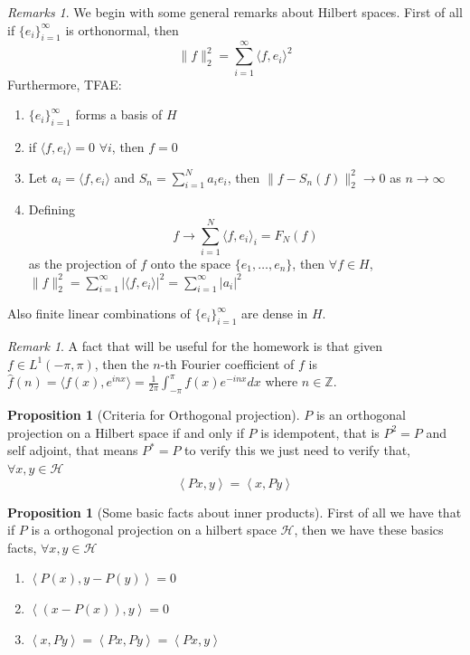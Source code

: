 \documentclass[13pt]{article}
\newcommand{\inprod}[1]{\left\langle #1 \right\rangle}
\theoremstyle{definition} --- default
\newtheorem{proposition}[theorem]{Proposition}
\theoremstyle{definition}
\theoremstyle{remark}
\newtheorem{remark}[theorem]{Remark}
\newtheorem{remarks}[theorem]{Remarks}
\begin{document}
\begin{remarks}
    We begin with some general remarks about Hilbert spaces. First of all if $\{e_i\}_{i=1}^\infty$ is orthonormal, then 
    $$\|f\|_2^2 = \sum_{i=1}^\infty \langle f, e_i \rangle^2$$
    Furthermore, TFAE: 
    \begin{enumerate}
        \item $\{e_i\}_{i=1}^\infty$ forms a basis of $H$
        \item if $\langle f,e_i \rangle = 0$ $\forall i$, then $f = 0$
        \item Let $a_i = \langle f, e_i \rangle$ and $S_n = \sum_{i=1}^N a_i e_i$, then $\|f - S_n(f)\|_2^2 \to 0$ as $n \to \infty$
        \item Defining
        $$ f \to \sum_{i=1}^N \langle f, e_i \rangle_i = F_N(f)$$ as the projection of $f$ onto the space $\{e_1,\ldots,e_n\}$, then $\forall f \in H$, $\|f\|_2^2 = \sum_{i=1}^\infty |\langle f, e_i \rangle|^2 = \sum_{i=1}^\infty |a_i|^2$
    \end{enumerate}
    Also finite linear combinations of $\{e_i\}_{i=1}^\infty$ are dense in $H$.
\begin{remark}
    A fact that will be useful for the homework is that given $f \in L^1(-\pi, \pi)$, then the $n$-th Fourier coefficient of $f$ is $\hat{f}(n) = \langle f(x),e^{inx} \rangle = \frac{1}{2\pi} \int_{-\pi}^\pi f(x)e^{-inx}dx$ where $n \in \mathbb{Z}$.
\end{remark}
\begin{proposition}[Criteria for Orthogonal projection]
	$P$ is an orthogonal projection on a Hilbert space if and only if $P$ is idempotent, that is $P^2 = P$ and self adjoint, that means $P^* = P$ to verify this we just need to verify that, $\forall x,y \in \mathcal{H}$
	$$
		\inprod{Px, y} = \inprod{x,Py}
	$$

\end{proposition}
\begin{proposition}[Some basic facts about inner products]
	First of all we have that if $P$ is a orthogonal projection on a hilbert space $\mathcal{H}$, then we have these basics facts, $\forall x,y \in \mathcal{H}$
	\begin{enumerate}
		\item $\inprod{P(x), y-P(y)}= 0$
		\item $\inprod{(x-P(x)), y} = 0$
		\item $\inprod{x,Py} = \inprod{Px,Py} = \inprod{Px,y}$
	\end{enumerate}


\end{proposition}
\end{remarks}
\end{document}
